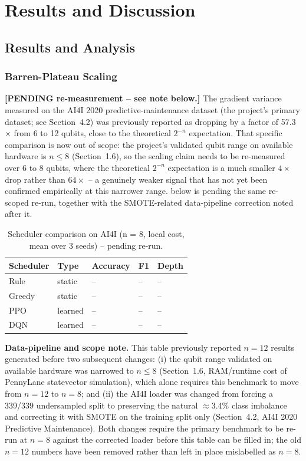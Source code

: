 \section{Results and Discussion}
\subsection{Results and Analysis}

\subsubsection{Barren-Plateau Scaling}
\textbf{[PENDING re-measurement -- see note below.]} The gradient variance measured on the AI4I 2020 predictive-maintenance dataset (the project's primary dataset; see Section~4.2) was previously reported as dropping by a factor of 57.3$\times$ from 6 to 12 qubits, close to the theoretical $2^{-n}$ expectation. That specific comparison is now out of scope: the project's validated qubit range on available hardware is $n\le8$ (Section~1.6), so the scaling claim needs to be re-measured over 6 to 8 qubits, where the theoretical $2^{-n}$ expectation is a much smaller $4\times$ drop rather than $64\times$ -- a genuinely weaker signal that has not yet been confirmed empirically at this narrower range.  below is pending the same re-scoped re-run, together with the SMOTE-related data-pipeline correction noted after it.

\begin{table}[htbp]
\centering
\caption{Scheduler comparison on AI4I (n = 8, local cost, mean over 3 seeds) -- pending re-run.}
\label{tab:ai4i}
\begin{tabular}{|p{3cm}|p{2cm}|p{2.3cm}|p{2cm}|p{2.5cm}|}
\hline
\textbf{Scheduler} & \textbf{Type} & \textbf{Accuracy} & \textbf{F1} & \textbf{Depth} \\
\hline
Rule & static & -- & -- & -- \\
Greedy & static & -- & -- & -- \\
PPO & learned & -- & -- & -- \\
DQN & learned & -- & -- & -- \\
\hline
\end{tabular}
\end{table}

\textbf{Data-pipeline and scope note.} This table previously reported $n=12$ results generated before two subsequent changes: (i) the qubit range validated on available hardware was narrowed to $n\le8$ (Section~1.6, RAM/runtime cost of PennyLane statevector simulation), which alone requires this benchmark to move from $n=12$ to $n=8$; and (ii) the AI4I loader was changed from forcing a 339/339 undersampled split to preserving the natural $\approx$3.4\% class imbalance and correcting it with SMOTE on the training split only (Section~4.2, AI4I 2020 Predictive Maintenance). Both changes require the primary benchmark to be re-run at $n=8$ against the corrected loader before this table can be filled in; the old $n=12$ numbers have been removed rather than left in place mislabelled as $n=8$.

